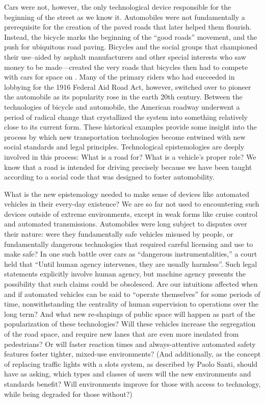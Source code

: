 Cars were not, however, the only technological device responsible for
the beginning of the street as we know it.
Automobiles were not fundamentally a prerequisite for the creation of the paved
roads that later helped them flourish. Instead, the bicycle marks the
beginning of the ``good roads'' movement, and the push for ubiquitous
road
paving\cite{???-http://www.vox.com/2015/3/19/8253035/roads-cyclists-cars-history}.
Bicycles and the social groups that championed their use--aided by
asphalt manufacturers and other special interests who saw money to be made---created the
very roads that bicycles then had to compete with cars for space on
\cite{???-vox2}. Many of the primary riders who had succeeded in lobbying for
the 1916 Federal Aid Road Act, however, switched over to pioneer the
automobile as its popularity rose in the earth 20th century. Between
the technologies of bicycle and automobile, the American roadway
underwent a period of radical change that crystallized the system into
something relatively close to its current form. These historical
examples provide some insight into the process by which new
transportation technologies become entwined with new social standards
and legal principles. Technological epistemologies are deeply involved
in this process: What is a road for? What is a vehicle's
proper role? We know that a road is intended for driving precisely
because we have been taught according to a social code that was
designed to foster automobility.

What is the new epistemology needed to make sense of devices like
automated vehicles in their every-day existence? We are so far not
used to encountering such devices outside of extreme environments,
except in weak forms like cruise control and automated transmissions.
Automobiles were long subject to disputes over their nature: were they
fundamentally safe vehicles misused by people, or fundamentally
dangerous technologies that required careful licensing and use to
make safe? In one such battle over cars as ``dangerous
instrumentalities,'' a court held that ``Until human agency intervenes, they are usually
harmless''\cite[p. 10]{???-lochlannjain}. Such legal statements
explicitly involve human agency, but machine agency presents the
possibility that such claims could be obsolesced. Are our intuitions
affected when and if automated vehicles can be said to ``operate
themselves'' for some periods of time, nonwithstanding the centrality
of human supervision to operations over the long term?
And what new re-shapings of public space will happen as part of the 
popularization of these technologies? Will these vehicles increase the
segregation of the road space, and require new lanes that are even
more insulated from pedestrians? Or will faster reaction times and
always-attentive automated safety features foster tighter, mixed-use
environments? (And additionally, as the concept of replacing traffic
lights with a slots system, as described by Paolo Santi, should have
as asking, which types and classes of users will the new environments
and standards benefit? Will environments improve for those with access
to technology, while being degraded for those without?) 

